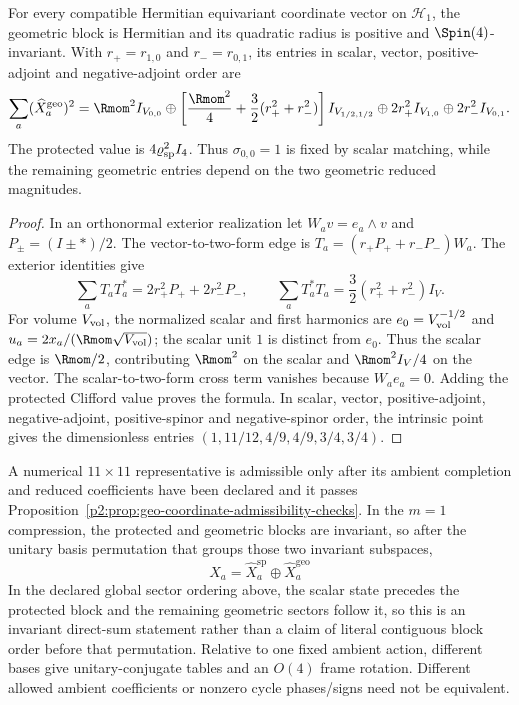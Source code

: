\documentclass[11pt,a4paper]{article}
\begin{document}
\begin{proposition}
\label{p2:prop:geo-coordinate-admissibility-checks}
For every compatible Hermitian equivariant coordinate vector on $\mathcal H_1$,
the geometric block is Hermitian and its quadratic radius is positive and
$\Spin(4)$-invariant. With $r_+=r_{1,0}$ and $r_-=r_{0,1}$, its entries in
scalar, vector, positive-adjoint and negative-adjoint order are
\[
 \sum_a(\widehat X_a^{\rm geo})^2
 =\Rmom^2 I_{V_{0,0}}
 \oplus\left[\frac{\Rmom^2}{4}
             +\frac32(r_+^2+r_-^2)\right]I_{V_{1/2,1/2}}
 \oplus2r_+^2 I_{V_{1,0}}
 \oplus2r_-^2 I_{V_{0,1}}.
\]
The protected value is $4\varrho_{\rm sp}^2I_4$.
Thus $\sigma_{0,0}=1$ is fixed by scalar matching, while the remaining
geometric entries depend on the two geometric reduced magnitudes.
\end{proposition}
\begin{proof}
In an orthonormal exterior realization let
$W_av=e_a\wedge v$ and $P_\pm=(I\pm *)/2$. The vector-to-two-form edge is
$T_a=(r_+P_++r_-P_-)W_a$. The exterior identities give
\[
 \sum_aT_aT_a^*=2r_+^2P_++2r_-^2P_-,
 \qquad
 \sum_aT_a^*T_a=\frac32(r_+^2+r_-^2)I_V.
\]
For volume $V_{\rm vol}$, the normalized scalar and first harmonics are
$e_0=V_{\rm vol}^{-1/2}$ and $u_a=2x_a/(\Rmom\sqrt{V_{\rm vol}})$;
the scalar unit $1$ is distinct from $e_0$. Thus the scalar edge is
$\Rmom/2$, contributing $\Rmom^2$ on the scalar and
$\Rmom^2I_V/4$ on the vector. The scalar-to-two-form cross term vanishes
because $W_ae_a=0$. Adding the protected Clifford value proves the formula. In scalar, vector,
positive-adjoint, negative-adjoint, positive-spinor and negative-spinor
order, the intrinsic point gives the dimensionless entries
$(1,11/12,4/9,4/9,3/4,3/4)$.
\end{proof}
\begin{remark}
A numerical \(11\times11\) representative is admissible only after its ambient
completion and reduced coefficients have been declared and it passes
Proposition~\ref{p2:prop:geo-coordinate-admissibility-checks}.  In the
\(m=1\) compression, the protected and geometric blocks are invariant, so
after the unitary basis permutation that groups those two invariant
subspaces,
\[
\hat X_a=\hat X_a^{\mathrm{sp}}\oplus \hat X_a^{\mathrm{geo}}
\]
In the declared global sector ordering above, the scalar state precedes the
protected block and the remaining geometric sectors follow it, so this is an
invariant direct-sum statement rather than a claim of literal contiguous
block order before that permutation.  Relative to one fixed ambient action,
different bases give unitary-conjugate tables and an \(O(4)\) frame rotation.
Different allowed ambient coefficients or nonzero cycle phases/signs need not
be equivalent.
\end{remark}
\end{document}

